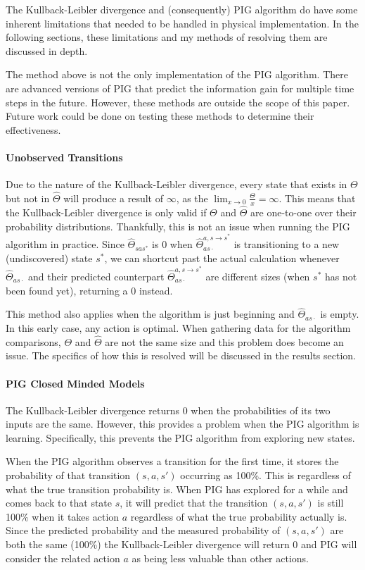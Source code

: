 \documentclass[letterpaper]{article} %
\begin{document}
The Kullback-Leibler divergence and (consequently) PIG algorithm do have some inherent limitations that needed to be handled in physical implementation. In the following sections, these limitations and my methods of resolving them are discussed in depth.

The method above is not the only implementation of the PIG algorithm. There are advanced versions of PIG that predict the information gain for multiple time steps in the future. However, these methods are outside the scope of this paper. Future work could be done on testing these methods to determine their effectiveness.

\paragraph{Unobserved Transitions}
Due to the nature of the Kullback-Leibler divergence, every state that exists in $\Theta$ but not in $\hat{\Theta}$ will produce a result of $\infty$, as the $\lim_{x \rightarrow 0} \frac{\Theta}{x} = \infty$. This means that the Kullback-Leibler divergence is only valid if $\Theta$ and $\hat{\Theta}$ are one-to-one over their probability distributions. Thankfully, this is not an issue when running the PIG algorithm in practice. Since $\hat{\Theta}_{sas^{*}}$ is 0 when $\hat{\Theta}_{as\cdot}^{a,s \rightarrow s^{*}}$ is transitioning to a new (undiscovered) state $s^{*}$, we can shortcut past the actual calculation whenever  $\hat{\Theta}_{as\cdot}$ and their predicted counterpart $\hat{\Theta}_{as\cdot}^{a,s \rightarrow s^{*}}$ are different sizes (when $s^{*}$ has not been found yet), returning a 0 instead.

This method also applies when the algorithm is just beginning and $\hat{\Theta}_{as\cdot}$ is empty. In this early case, any action is optimal. When gathering data for the algorithm comparisons, $\Theta$ and $\hat{\Theta}$ are not the same size and this problem does become an issue. The specifics of how this is resolved will be discussed in the results section.

\paragraph{PIG Closed Minded Models}
The Kullback-Leibler divergence returns 0 when the probabilities of its two inputs are the same. However, this provides a problem when the PIG algorithm is learning. Specifically, this prevents the PIG algorithm from exploring new states.

When the PIG algorithm observes a transition for the first time, it stores the probability of that transition $(s,a,s')$ occurring as 100\%. This is regardless of what the true transition probability is. When PIG has explored for a while and comes back to that state $s$, it will predict that the transition $(s,a,s')$ is still 100\% when it takes action $a$ regardless of what the true probability actually is. Since the predicted probability and the measured probability of $(s,a,s')$ are both the same (100\%) the Kullback-Leibler divergence will return 0 and PIG will consider the related action $a$ as being less valuable than other actions.
\end{document}
